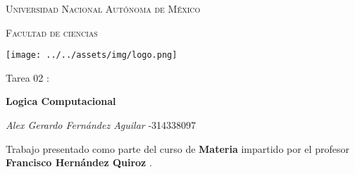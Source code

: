 \documentclass[10pt,letterpaper,fleqn]{article}
\begin{document}
\begin{titlepage}
    \centering

    {\scshape\LARGE Universidad Nacional Autónoma de México \par}

    \vspace{1cm}
    {\scshape\Large Facultad de ciencias\par}
    \vspace{1.5cm}

    \begin{center}
        \texttt{[image: ../../assets/img/logo.png]}
    \end{center}

    \vspace{.8 cm}

    {\LARGE Tarea  02 : \par}
    {\huge\bfseries Logica Computacional\par}

    \vspace{0.5cm}
    \large{\itshape{Alex Gerardo Fernández Aguilar}} \small{ -314338097 } \\ \vspace{0.3cm}
    
   
    \vfill

    Trabajo presentado como parte del curso de
    \textbf{Materia}
    impartido por el profesor \textbf{ Francisco Hernández Quiroz }. \par
    \vspace{0.1cm}
\end{titlepage}
\end{document}
